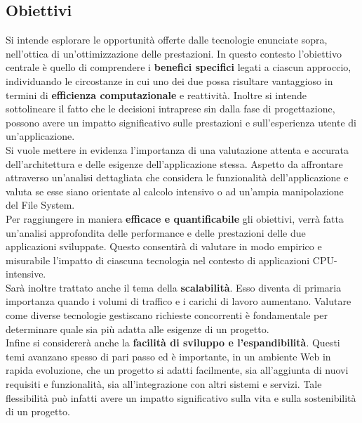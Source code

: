 \subsection{Obiettivi}
Si intende esplorare le opportunità offerte dalle tecnologie enunciate sopra, nell'ottica di un'ottimizzazione delle prestazioni.
In questo contesto l'obiettivo centrale è quello di comprendere i \textbf{benefici specifici} legati a ciascun approccio, individuando le circostanze in cui uno dei due possa risultare vantaggioso in termini di \textbf{efficienza computazionale} e reattività. 
Inoltre si intende sottolineare il fatto che le decisioni intraprese sin dalla fase di progettazione, possono avere un impatto significativo sulle prestazioni e sull'esperienza utente di un'applicazione.
\\Si vuole mettere in evidenza l'importanza di una valutazione attenta e accurata dell'architettura e delle esigenze dell'applicazione stessa.
Aspetto da affrontare attraverso un'analisi dettagliata che considera le funzionalità dell'applicazione e valuta se esse siano orientate al calcolo intensivo o ad un'ampia manipolazione del File System.
\\Per raggiungere in maniera \textbf{efficace e quantificabile} gli obiettivi, verrà fatta un'analisi approfondita delle performance e delle prestazioni delle due applicazioni sviluppate.
Questo consentirà di valutare in modo empirico e misurabile l'impatto di ciascuna tecnologia nel contesto di applicazioni CPU-intensive.
\\Sarà inoltre trattato anche il tema della \textbf{scalabilità}. Esso diventa di primaria importanza quando i volumi di traffico e i carichi di lavoro aumentano. Valutare come diverse tecnologie gestiscano richieste concorrenti è fondamentale per determinare quale sia più adatta alle esigenze di un progetto.
\\Infine si considererà anche la \textbf{facilità di sviluppo e l'espandibilità}. 
Questi temi avanzano spesso di pari passo ed è importante, in un ambiente Web in rapida evoluzione, che un progetto si adatti facilmente, sia all'aggiunta di nuovi requisiti e funzionalità, sia all'integrazione con altri sistemi e servizi. Tale flessibilità può infatti avere un impatto significativo sulla vita e sulla sostenibilità di un progetto.


\newpage

